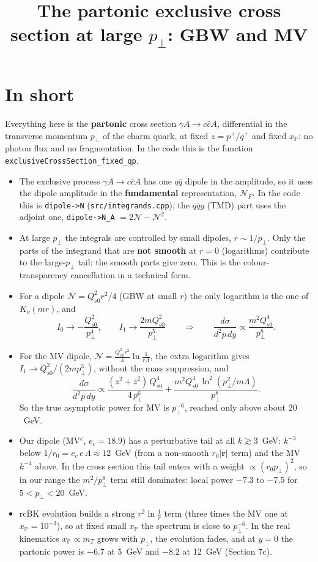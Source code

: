 \documentclass[12pt]{article}
\title{The partonic exclusive cross section at large $p_\perp$: GBW and MV}
\author{}
\date{}
\newcommand{\pt}{p_\perp}
\begin{document}
\maketitle

\section*{In short}

Everything here is the \textbf{partonic} cross section $\gamma A\to c\bar c A$, differential in the
transverse momentum $p_\perp$ of the charm quark, at fixed $z=p^+/q^+$ and fixed $x_{\mathbb P}$: no photon flux
and no fragmentation. In the code this is the function\\
\texttt{exclusiveCrossSection\_fixed\_qp}.

\begin{itemize}
\item The exclusive process $\gamma A\to c\bar c A$ has one $q\bar q$ dipole in the amplitude, so it
uses the dipole amplitude in the \textbf{fundamental} representation, $\mathcal{N}_F$. In the code this
is \texttt{dipole->N} (\texttt{src/integrands.cpp}); the $q\bar qg$ (TMD) part uses the adjoint one,
\texttt{dipole->N\_A} $=2\mathcal{N}-\mathcal{N}^2$.
\item At large $\pt$ the integrals are controlled by small dipoles, $r\sim1/\pt$. Only the parts of the
integrand that are \textbf{not smooth} at $r=0$ (logarithms) contribute to the large-$\pt$ tail: the
smooth parts give zero. This is the colour-transparency cancellation in a technical form.
\item For a dipole $\mathcal{N}=Q_{s0}^2r^2/4$ (GBW at small $r$) the only logarithm is the one of
$K_\nu(mr)$, and
\[
  I_0\to-\frac{Q_{s0}^2}{\pt^4},\qquad I_1\to\frac{2mQ_{s0}^2}{\pt^5}
  \qquad\Longrightarrow\qquad \frac{d\sigma}{d^2p\,dy}\propto\frac{m^2Q_{s0}^4}{\pt^8}.
\]
\item For the MV dipole, $\mathcal{N}=\tfrac{Q_{s0}^2r^2}{4}\ln\tfrac{1}{r\Lambda}$, the extra logarithm
gives $I_1\to Q_{s0}^2/(2m\pt^3)$, without the mass suppression, and
\[
  \frac{d\sigma}{d^2p\,dy}\propto\frac{(z^2+\bar z^2)\,Q_{s0}^4}{4\,\pt^6}
  +\frac{m^2Q_{s0}^4\,\ln^2(\pt^2/m\Lambda)}{\pt^8}.
\]
So the true asymptotic power for MV is $\pt^{-6}$, reached only above about $20$~GeV.
\item Our dipole (MV$^e$, $e_c=18.9$) has a perturbative tail at all $k\gtrsim3$~GeV: $k^{-3}$ below
$1/r_0=e_c\,e\,\Lambda\approx12$~GeV (from a non-smooth $r_0|\mathbf r|$ term) and the MV $k^{-4}$ above.
In the cross section this tail enters with a weight $\propto(r_0\pt)^2$, so in our range the $m^2/\pt^8$
term still dominates: local power $-7.3$ to $-7.5$ for $5<\pt<20$~GeV.
\item rcBK evolution builds a strong $r^2\ln\frac1r$ term (three times the MV one at $x_{\mathbb P}=10^{-3}$),
so at fixed small $x_{\mathbb P}$ the spectrum is close to $\pt^{-6}$. In the real
kinematics $x_{\mathbb P}\propto m_T$ grows with $\pt$, the evolution fades, and at $y=0$ the partonic
power is $-6.7$ at 5~GeV and $-8.2$ at 12~GeV (Section 7c).
\end{itemize}
\end{document}
